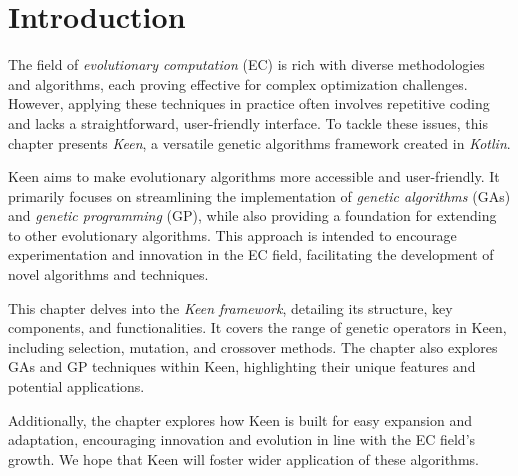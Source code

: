 \section{Introduction}
\label{sec:introduction}
    The field of \textit{evolutionary computation} (EC) is rich with diverse methodologies and algorithms, each 
    proving effective for complex optimization challenges. However, applying these techniques in practice often 
    involves repetitive coding and lacks a straightforward, user-friendly interface. To tackle these issues, this 
    chapter presents \emph{Keen}, a versatile genetic algorithms framework created in \textit{Kotlin}.

    Keen aims to make evolutionary algorithms more accessible and user-friendly. It primarily focuses on streamlining 
    the implementation of \textit{genetic algorithms} (GAs) and \textit{genetic programming} (GP), while also 
    providing a foundation for extending to other evolutionary algorithms. This approach is intended to encourage
    experimentation and innovation in the EC field, facilitating the development of novel algorithms and techniques.

    This chapter delves into the \textit{Keen framework}, detailing its structure, key components, and 
    functionalities. It covers the range of genetic operators in Keen, including selection, mutation, and crossover 
    methods. The chapter also explores GAs and GP techniques within Keen, highlighting their unique features and 
    potential applications.

    Additionally, the chapter explores how Keen is built for easy expansion and adaptation, encouraging innovation 
    and evolution in line with the EC field's growth. We hope that Keen will foster wider application of these 
    algorithms.

